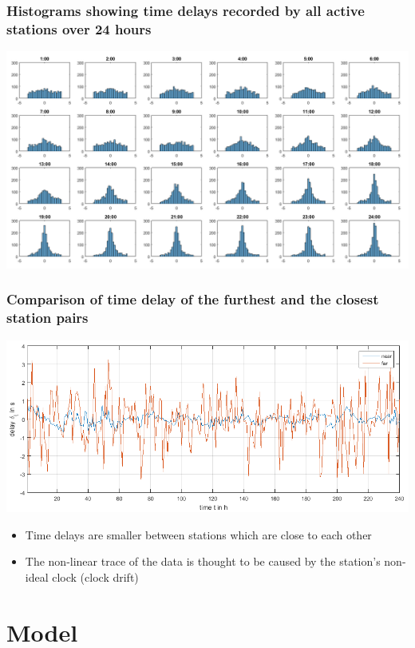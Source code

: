 \documentclass{beamer}
\begin{document}
\begin{frame}
\frametitle{Histograms showing time delays recorded by all active stations over 24 hours}
\includegraphics[width=\textwidth]{hourlydelaydistributionoverallstationsforoneday.png}
\end{frame}

\begin{frame}
\frametitle{Comparison of time delay of the furthest and the closest station pairs}
\includegraphics[width=\textwidth]{Comparisondelayoverrandomdayoffarestandclosestlinks.png}

\begin{itemize}
\item Time delays are smaller between stations which are close to each other
\item The non-linear trace of the data is thought to be caused by the station's non-ideal clock (clock drift)
\end{itemize}
\end{frame}

\section{Model}
\end{document}
